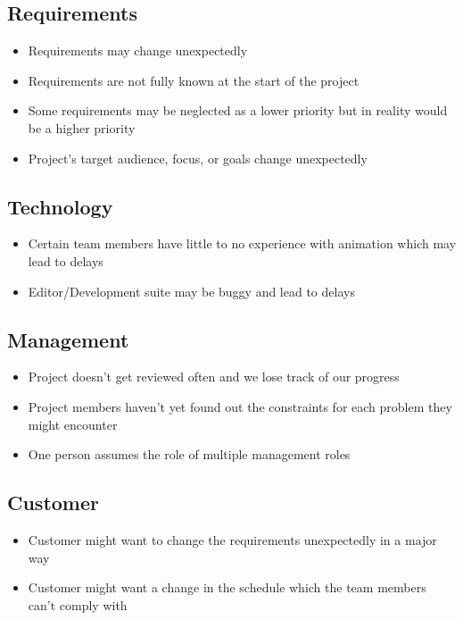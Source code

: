 \documentclass[12pt]{article}
\begin{document}
\subsection{Requirements}
\begin{itemize}
 \item Requirements may change unexpectedly
 \item Requirements are not fully known at the start of the project
 \item Some requirements may be neglected as a lower priority but in reality would be a higher priority
 \item Project’s target audience, focus, or goals change unexpectedly
\end{itemize}

\subsection{Technology}
\begin{itemize}
 \item Certain team members have little to no experience with animation which may lead to delays
 \item Editor/Development suite may be buggy and lead to delays
\end{itemize}

\subsection{Management}
\begin{itemize}
 \item Project doesn’t get reviewed often and we lose track of our progress
 \item Project members haven’t yet found out the constraints for each problem they might encounter
 \item One person assumes the role of multiple management roles
\end{itemize}

\subsection{Customer}
\begin{itemize}
 \item Customer might want to change the requirements unexpectedly in a major way
 \item Customer might want a change in the schedule which the team members can’t comply with
\end{itemize}
\end{document}
